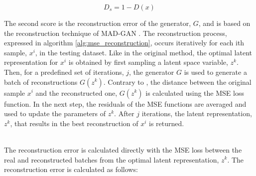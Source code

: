 \begin{equation}
    D_{s} = 1 - D(x)
\end{equation}

The second score is the reconstruction error of the generator, $G$, and is based on the reconstruction technique of MAD-GAN \cite{li.etal_MADGANMultivariateAnomaly_2019}. The reconstruction process, expressed in algorithm \ref{alg:mse_reconstruction}, occurs iteratively for each ith sample, $x^i$, in the testing dataset. Like in the original method, the optimal latent representation for $x^i$ is obtained by first sampling a latent space variable, $z^k$. Then, for a predefined set of iterations, $j$, the generator $G$ is used to generate a batch of reconstructions $G(z^{k})$. Contrary to \cite{li.etal_MADGANMultivariateAnomaly_2019}, the distance between the original sample $x^i$ and the reconstructed one, $G(z^{k})$ is calculated using the MSE loss function. In the next step, the residuals of the MSE functions are averaged and used to update the parameters of $z^{k}$. After $j$ iterations, the latent representation, $z^{k}$, that results in the best reconstruction of $x^i$ is returned.
\\\\
\noindent{}

The reconstruction error is calculated directly with the MSE loss between the real and reconstructed batches from the optimal latent representation, $z^{k}$. The reconstruction error is calculated as follows:


